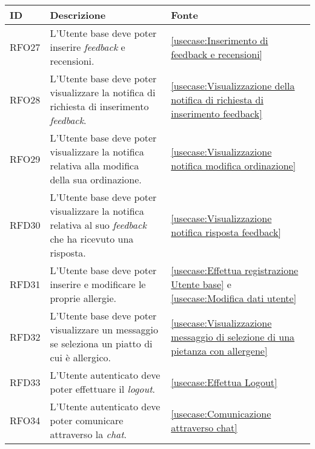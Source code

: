 \begin{table}[H]
	\renewcommand{\arraystretch}{1.5}
	\centering
	\begin{tabularx}{\textwidth}{l|X|p{2cm}}
		\textbf{ID} & \textbf{Descrizione}                                                                                              & \textbf{Fonte}                                                                        \\
		\hline
		RFO27       & L'Utente base deve poter inserire \textit{feedback} e recensioni.                                                 & \autoref{usecase:Inserimento di feedback e recensioni}                                \\
		\hline
		RFO28       & L'Utente base deve poter visualizzare la notifica di richiesta di inserimento \textit{feedback}.                  & \autoref{usecase:Visualizzazione della notifica di richiesta di inserimento feedback} \\
		\hline
		RFO29       & L'Utente base deve poter visualizzare la notifica relativa alla modifica della sua ordinazione.                   & \autoref{usecase:Visualizzazione notifica modifica ordinazione}                       \\
		\hline
		RFD30       & L'Utente base deve poter visualizzare la notifica relativa al suo \textit{feedback} che ha ricevuto una risposta. & \autoref{usecase:Visualizzazione notifica risposta feedback}                          \\
		\hline
		RFD31       & L'Utente base deve poter inserire e modificare le proprie allergie. 												& \autoref{usecase:Effettua registrazione Utente base} e \autoref{usecase:Modifica dati utente}                      \\
		\hline
		RFD32       & L'Utente base deve poter visualizzare un messaggio se seleziona un piatto di cui è allergico. 					& \autoref{usecase:Visualizzazione messaggio di selezione di una pietanza con allergene}                      \\
		\hline
		RFD33       & L'Utente autenticato deve poter effettuare il \textit{logout}.                                                    & \autoref{usecase:Effettua Logout}                                                     \\
		\hline
		RFO34       & L'Utente autenticato deve poter comunicare attraverso la \textit{chat}.                                           & \autoref{usecase:Comunicazione attraverso chat}                                       \\

\end{tabularx}
\end{table}
